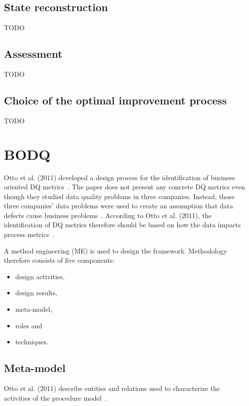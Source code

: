 \subsection{State reconstruction}

TODO

\subsection{Assessment}

TODO

\subsection{Choice of the optimal improvement process}

TODO

\section{BODQ}

Otto et al. (2011) developed a design process for the identification of business oriented DQ metrics~\cite{otto2011}.
The paper does not present any concrete DQ metrics even though they studied data quality problems in three companies.
Instead, those three companies' data problems were used to create an assumption that data defects cause business problems~\cite{otto2011}.
According to Otto et al. (2011), the identification of DQ metrics therefore should be based on how the data impacts process metrics~\cite{otto2011}.

A method engineering (ME) is used to design the framework.
Methodology therefore consists of five components:

\begin{itemize}
    \item design activities,
    \item design results,
    \item meta-model,
    \item roles and
    \item techniques.
\end{itemize}

\subsection{Meta-model}

Otto et al. (2011) describe entities and relations used to characterize the activities of the procedure model~\cite{otto2011}.

